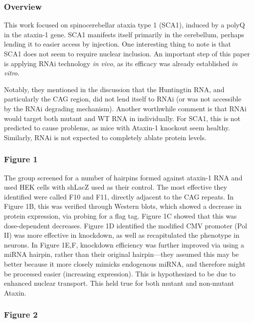 \subsubsection*{Overview}

This work focused on spinocerebellar ataxia type 1 (SCA1), induced by a polyQ in the ataxin-1 gene. SCA1 manifests itself primarily in the cerebellum, perhaps lending it to easier access by injection. One interesting thing to note is that SCA1 does not seem to require nuclear inclusion. An important step of this paper is applying RNAi technology \textit{in vivo}, as its efficacy was already established \textit{in vitro}.\newline

Notably, they mentioned in the discussion that the Huntingtin RNA, and particularly the CAG region, did not lend itself to RNAi (or was not accessible by the RNAi degrading mechanism). Another worthwhile comment is that RNAi would target both mutant and WT RNA in individually. For SCA1, this is not predicted to cause problems, as mice with Ataxin-1 knockout seem healthy. Similarly, RNAi is not expected to completely ablate protein levels. 


\subsubsection*{Figure 1}

The group screened for a number of hairpins formed against ataxin-1 RNA and used HEK cells with shLacZ used as their control. The most effective they identified were called F10 and F11, directly adjacent to the CAG repeats. In Figure 1B, this was verified through Western blots, which showed a decrease in protein expression, via probing for a flag tag. Figure 1C showed that this was dose-dependent decreases. Figure 1D identified the modified CMV promoter (Pol II) was more effective in knockdown, as well as recapitulated the phenotype in neurons. In Figure 1E,F, knockdown efficiency was further improved via using a miRNA hairpin, rather than their original hairpin---they assumed this may be better because it more closely mimicks endogenous miRNA, and therefore might be processed easier (increasing expression). This is hypothesized to be due to enhanced nuclear transport. This held true for both mutant and non-mutant Ataxin. 

\subsubsection*{Figure 2}

